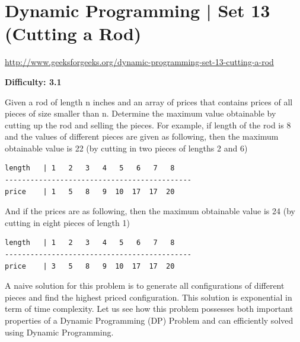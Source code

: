 
\section{Dynamic Programming | Set 13 (Cutting a Rod)
  \label{secGFGDPSet13CuttingARod}}

\url{http://www.geeksforgeeks.org/dynamic-programming-set-13-cutting-a-rod}

\textbf{Difficulty: 3.1}

Given a rod of length n inches and an array of prices that contains prices
of all pieces of size smaller than n. Determine the maximum value obtainable
by cutting up the rod and selling the pieces. For example, if length of the
rod is 8 and the values of different pieces are given as following, then the
maximum obtainable value is 22 (by cutting in two pieces of lengths 2 and 6)
\begin{lstlisting}[style=raygeneric]
length   | 1   2   3   4   5   6   7   8  
--------------------------------------------
price    | 1   5   8   9  10  17  17  20
\end{lstlisting}
And if the prices are as following, then the maximum obtainable value is 24
(by cutting in eight pieces of length 1)
\begin{lstlisting}[style=raygeneric]
length   | 1   2   3   4   5   6   7   8  
--------------------------------------------
price    | 3   5   8   9  10  17  17  20
\end{lstlisting}

\textbf{}

\RayNotesBegin



\RayNotesEnd

\textbf{}

A naive solution for this problem is to generate all configurations of
different pieces and find the highest priced configuration. This solution is
exponential in term of time complexity. Let us see how this problem
possesses both important properties of a Dynamic Programming (DP) Problem
and can efficiently solved using Dynamic Programming.


